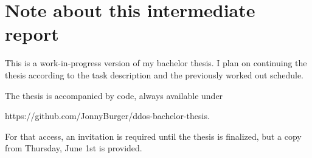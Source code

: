 \chapter{Note about this intermediate report}

This is a work-in-progress version of my bachelor thesis.
I plan on continuing the thesis according to the task description and the previously worked out schedule.

The thesis is accompanied by code, always available under

https://github.com/JonnyBurger/ddos-bachelor-thesis.

For that access, an invitation is required until the thesis is finalized, but a copy from Thursday, June 1st is provided.
